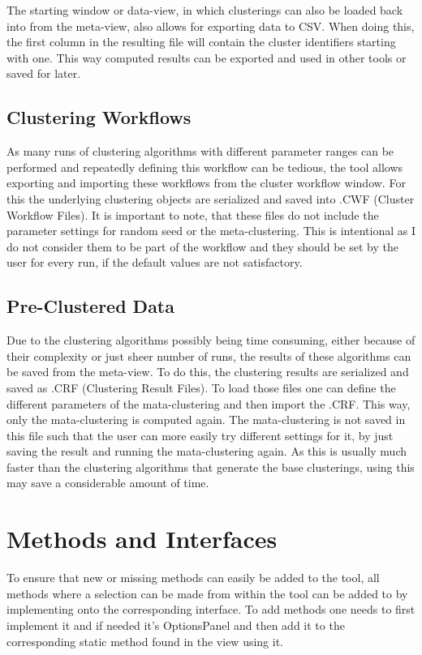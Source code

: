 \documentclass[
	a4paper,
	english,
	twoside,
	openright,               
	11pt                            
	]{report}
\begin{document}
The starting window or data-view, in which clusterings can also be loaded back into from the meta-view, also allows for exporting data to CSV. When doing this, the first column in the resulting file will contain the cluster identifiers starting with one. This way computed results can be exported and used in other tools or saved for later.

\subsection{Clustering Workflows}
As many runs of clustering algorithms with different parameter ranges can be performed and repeatedly defining this workflow can be tedious, the tool allows exporting and importing these workflows from the cluster workflow window. For this the underlying clustering objects are serialized and saved into .CWF (Cluster Workflow Files). It is important to note, that these files do not include the parameter settings for random seed or the meta-clustering. This is intentional as I do not consider them to be part of the workflow and they should be set by the user for every run, if the default values are not satisfactory.

\subsection{Pre-Clustered Data}
Due to the clustering algorithms possibly being time consuming, either because of their complexity or just sheer number of runs, the results of these algorithms can be saved from the meta-view. To do this, the clustering results are serialized and saved as .CRF (Clustering Result Files). To load those files one can define the different parameters of the mata-clustering and then import the .CRF. This way, only the mata-clustering is computed again. The mata-clustering is not saved in this file such that the user can more easily try different settings for it, by just saving the result and running the mata-clustering again. As this is usually much faster than the clustering algorithms that generate the base clusterings, using this may save a considerable amount of time.

\section{Methods and Interfaces}
To ensure that new or missing methods can easily be added to the tool, all methods where a selection can be made from within the tool can be added to by implementing onto the corresponding interface. To add methods one needs to first implement it and if needed it's OptionsPanel and then add it to the corresponding static method found in the view using it.
\end{document}
